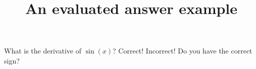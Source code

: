 \documentclass[hidesidemenu]{webquiz}
\title{An evaluated answer example}
\begin{document}
  \begin{question}     %
     What is the derivative of $\sin(x)$?
     \whenRight Correct!
     \whenWrong Incorrect! Do you have the correct sign?
  \end{question}
\end{document}
